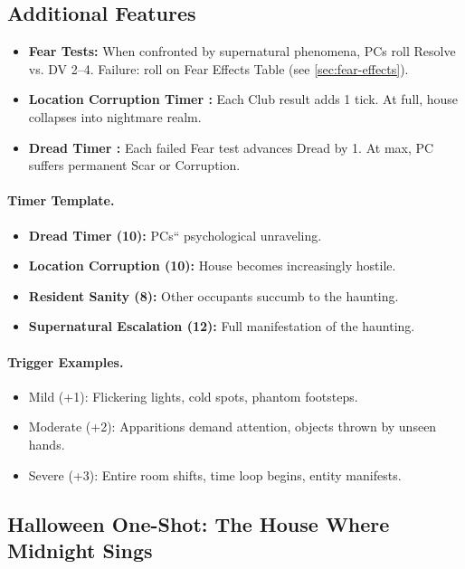 \documentclass[11pt]{article}
\begin{document}
\subsection*{Additional Features}
\begin{itemize}
\item \textbf{Fear Tests:} When confronted by supernatural phenomena, PCs roll Resolve vs. DV 2--4. Failure: roll on Fear Effects Table (see \ref{sec:fear-effects}).
\item \textbf{Location Corruption Timer :} Each Club result adds 1 tick. At full, house collapses into nightmare realm.
\item \textbf{Dread Timer :} Each failed Fear test advances Dread by 1. At max, PC suffers permanent Scar or Corruption.
\end{itemize}

\paragraph{Timer Template.}
\begin{itemize}
  \item \textbf{Dread Timer (10):} PCs`` psychological unraveling.
  \item \textbf{Location Corruption (10):} House becomes increasingly hostile.
  \item \textbf{Resident Sanity (8):} Other occupants succumb to the haunting.
  \item \textbf{Supernatural Escalation (12):} Full manifestation of the haunting.
\end{itemize}

\paragraph{Trigger Examples.}
\begin{itemize}
  \item Mild (+1): Flickering lights, cold spots, phantom footsteps.
  \item Moderate (+2): Apparitions demand attention, objects thrown by unseen hands.
  \item Severe (+3): Entire room shifts, time loop begins, entity manifests.
\end{itemize}

\subsection{Halloween One-Shot: The House Where Midnight Sings}
\end{document}
